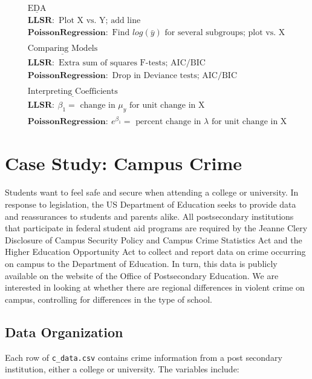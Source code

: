 \documentclass[
]{krantz}
\begin{document}
\begin{gather*}
\underline{\textrm{EDA}} \\
\mathbf{LLSR:}\textrm{ Plot X vs. Y; add line} \\
\mathbf{Poisson Regression:}\textrm{ Find }log(\bar{y})\textrm{ for several subgroups; plot vs. X} \\
\textrm{ } \\
\underline{\textrm{Comparing Models}} \\
\mathbf{LLSR:}\textrm{ Extra sum of squares F-tests; AIC/BIC} \\
\mathbf{Poisson Regression:}\textrm{ Drop in Deviance tests; AIC/BIC} \\
\textrm{ } \\
\underline{\textrm{Interpreting Coefficients}} \\
\mathbf{LLSR:}\ \beta_1=\textrm{ change in }\mu_y\textrm{ for unit change in X} \\
\mathbf{Poisson Regression:}\ e^{\beta_1}=\textrm{ percent change in }\lambda\textrm{ for unit change in X} 
\end{gather*}

\hypertarget{case-study-campus-crime}{%
\section{Case Study: Campus Crime}\label{case-study-campus-crime}}

Students want to feel safe and secure when attending a college or university. In response to legislation, the US Department of Education seeks to provide data and reassurances to students and parents alike. All postsecondary institutions that participate in federal student aid programs are required by the Jeanne Clery Disclosure of Campus Security Policy and Campus Crime Statistics Act and the Higher Education Opportunity Act to collect and report data on crime occurring on campus to the Department of Education. In turn, this data is publicly available on the website of the Office of Postsecondary Education. We are interested in looking at whether there are regional differences in violent crime on campus, controlling for differences in the type of school.

\hypertarget{data-organization-1}{%
\subsection{Data Organization}\label{data-organization-1}}

Each row of \texttt{c\_data.csv} contains crime information from a post secondary institution, either a college or university. The variables include:
\end{document}
